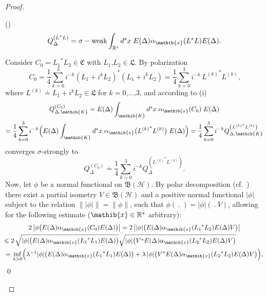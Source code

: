 \documentclass[11pt,twoside,openright]{report}
\theoremstyle{definition}
\theoremstyle{plain}
\theoremstyle{remark}
\theoremstyle{assumption}
\DeclareMathOperator{\sw}{\sigma-weak}
\newcommand{\abs}[1]{\lvert #1 \rvert}
\newcommand{\babs}[1]{\bigl\lvert #1 \bigr\rvert}
\newcommand{\norm}[1]{\lVert #1 \rVert}
\newcommand{\Cfrak}{\mathfrak{C}}
\newcommand{\Lfrak}{\mathfrak{L}}
\newcommand{\Kib}{\mathib{K}}
\newcommand{\xib}{\mathib{x}}
\newcommand{\Rs}{\mathbb{R}^s}
\newcommand{\BH}{\mathfrak{B} ( \mathscr{H} )}
\newcommand{\ED}{E ( \Delta )}
\newcommand{\aibx}{\alpha_\mathib{x}}
\newcounter{proofitem}
\newenvironment{prooflist}{\begin{list}{(\roman{proofitem})}%
  {\usecounter{proofitem} \setlength{\topsep}{0ex}%
   \setlength{\parsep}{0.2ex} \setlength{\itemsep}{0.4ex}%
   \setlength{\leftmargin}{0em} \setlength{\itemindent}{0.5em}%
   \setlength{\listparindent}{1em}}}{\qed \end{list}}
\begin{document}
\begin{proof}
\begin{prooflist}
\begin{equation*}
      Q_\Delta^{( L^* L )} = \sw \int_{\Rs} d^s x \; \ED \aibx ( L^* L
      ) \ED \text{.}
    \end{equation*}
  \item Consider $C_0 = {L_1}^* L_2 \in \Cfrak$ with $L_1 \text{,} L_2
    \in \Lfrak$. By polarization 
    \begin{equation*}
      C_0 = \frac{1}{4} \sum_{k = 0}^3 i^{-k} ( L_1 + i^k L_2 )^* (
      L_1 + i^k L_2 ) = \frac{1}{4} \sum_{k = 0}^3 i^{-k} \, {L^{( k
      )}}^* L^{( k )} \text{,} 
    \end{equation*}
    where $L^{( k )} \doteq L_1 + i^k L_2 \in \Lfrak$ for $k = 0
    \text{,} \dots \text{,} 3$, and according to (i)
    \begin{multline*}
      Q_{\Delta , \Kib}^{( C_0 )} = \ED \int_\Kib d^s x \; \aibx ( C_0
      ) \; \ED \\
      = \frac{1}{4} \sum_{k = 0}^3 i^{-k} \Bigl( \ED \int_\Kib d^s x
      \; \aibx \bigl( {L^{( k )}}^* L^{( k )} \bigr) \; \ED \Bigr) =
      \frac{1}{4} \sum_{k = 0}^3 i^{-k} Q_{\Delta , \Kib}^{\left(
      {L^{( k )}}^* L^{( k )} \right)}
    \end{multline*}
    converges $\sigma$-strongly to
    \begin{equation}
      \label{eq-polarization-limit}
      Q_\Delta^{( C_0 )} \doteq \frac{1}{4} \sum_{k = 0}^3 i^{-k}
      Q_\Delta^{\left( {L^{( k )}}^* L^{( k )} \right)} \text{.}
    \end{equation}
    Now, let $\phi$ be a normal functional on $\BH$. By polar
    decomposition (cf.~\cite[Theorem~III.4.2(i),
    Proposition~III.4.6]{takesaki:1979}) there exist a partial
    isometry $V \in \BH$ and a positive normal functional $\abs{\phi}$
    subject to the relation $\norm{\abs{\phi}} = \norm{\phi}$, such
    that $\phi(~.~) = \abs{\phi} (~.~V )$, allowing for the following
    estimate ($\xib \in \Rs$ arbitrary):
    \begin{multline*}
      2 \, \babs{\phi \bigl( \ED \aibx ( C_0 ) \ED \bigr)} = 2 \,
      \babs{\abs{\phi} \bigl( \ED \aibx ( {L_1}^* L_2 ) \ED V \bigr)}
      \\
      \mspace{-80mu} \leqslant 2 \, \sqrt{\abs{\phi} \bigl( \ED \aibx
      ( {L_1}^* L_1 ) \ED \bigr)} \sqrt{\abs{\phi} \bigl( V^* \ED
      \aibx ( {L_2}^* L_2 ) \ED V \bigr)} \\ 
      = \inf_{\lambda > 0} \Bigl( \lambda^{-1} \abs{\phi} \bigl( \ED
      \aibx ( {L_1}^* L_1 ) \ED \bigr) + \lambda \, \abs{\phi} \bigl(
      V^* \ED \aibx ( {L_2}^* L_2 ) \ED V \bigr) \Bigr) \text{,} 

\end{multline*}
\end{prooflist}
\end{proof}
\end{document}
